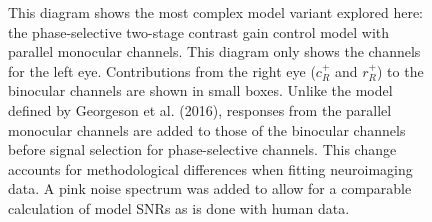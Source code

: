 \documentclass[review,
  12pt,
]{elsarticle}
\begin{document}
\begin{figure}


\caption{\label{fig-modelDiagram}This diagram shows the most complex
model variant explored here: the phase-selective two-stage contrast gain
control model with parallel monocular channels. This diagram only shows
the channels for the left eye. Contributions from the right eye
(\(c^+_R\) and \(r^+_R\)) to the binocular channels are shown in small
boxes. Unlike the model defined by Georgeson et al. (2016), responses
from the parallel monocular channels are added to those of the binocular
channels before signal selection for phase-selective channels. This
change accounts for methodological differences when fitting neuroimaging
data. A pink noise spectrum was added to allow for a comparable
calculation of model SNRs as is done with human data.}

\end{figure}%
\end{document}
